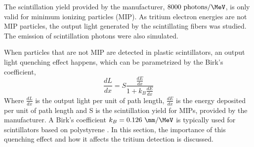 The scintillation yield provided by the manufacturer, $8000~\text{photons}/\MeV$, is only valid for minimum ionizing particles (MIP). As tritium electron energies are not MIP particles, the output light generated by the scintillating fibers was studied. The emission of scintillation photons were also simulated.

When particles that are not MIP are detected in plastic scintillators, an output light quenching effect happens, which can be parametrized by the Birk's coefficient\cite{BirksPaper}, 
\begin{equation}
\frac{dL}{dx}= S\frac{\displaystyle{\frac{dE}{dx}}}{1+k_B\displaystyle{\frac{dE}{dx}}}
\label{eq:birkscoefficient}
\end{equation}
Where $\frac{dL}{dx}$ is the output light per unit of path length, $\frac{dE}{dx}$ is the energy deposited per unit of path length and S is the scintillation yield for MIPs, provided by the manufacturer. A Birk's coefficient $k_B=0.126~\mm/\MeV$ is typically used for scintillators based on polystyrene \cite{BirksCoefficient}. In this section, the importance of this quenching effect and how it affects the tritium detection is discussed.

